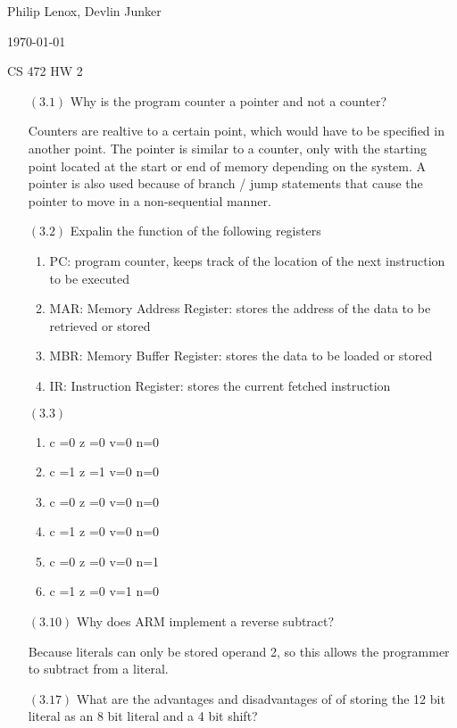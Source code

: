 \documentclass[letterpaper,10pt,titlepage]{article}
\def\name{Philip Lenox, Devlin Junker}
\begin{document}
\hfill \name

\hfill \today

\hfill CS 472 HW 2

\begin{enumerate}



\item[$(3.1)$]Why is the program counter a pointer and not a counter?
	 
	 Counters are realtive to a certain point, which would have to be specified in another point. The pointer is similar to a counter, only with the starting point located at the start or end of memory depending on the system. A pointer is also used because of branch / jump statements that cause the pointer to move in a non-sequential manner.
	
\item[$(3.2)$]Expalin the function of the following registers

\begin{enumerate}
\item PC: program counter, keeps track of the location of the next instruction to be executed
\item MAR: Memory Address Register: stores the address of the data to be retrieved or stored
\item MBR: Memory Buffer Register: stores the data to be loaded or stored
\item IR: Instruction Register: stores the current fetched instruction 
\end{enumerate}

\item[$(3.3)$]

\begin{enumerate}
\item c =0 z =0 v=0 n=0
\item c =1 z =1 v=0 n=0
\item c =0 z =0 v=0 n=0
\item c =1 z =0 v=0 n=0
\item c =0 z =0 v=0 n=1
\item c =1 z =0 v=1 n=0
\end{enumerate}

\item[$(3.10)$]Why does ARM implement a reverse subtract?

Because literals can only be stored operand 2, so this allows the programmer to subtract from a literal.
\item[$(3.17)$]What are the advantages and disadvantages of of storing the 12 bit literal as an 8 bit literal and a 4 bit shift?


\end{enumerate}
\end{document}
